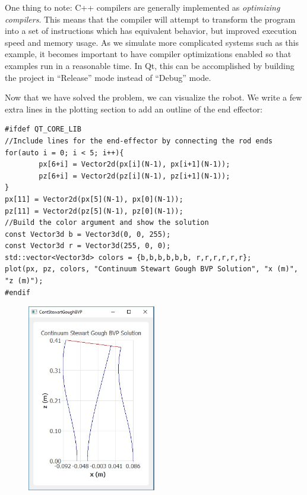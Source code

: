 \documentclass[12pt]{article}
\begin{document}
One thing to note: C++ compilers are generally implemented as \emph{optimizing compilers}. This means that the compiler will attempt to transform the program into a set of instructions which has equivalent behavior, but improved execution speed and memory usage. As we simulate more complicated systems such as this example, it becomes important to have compiler optimizations enabled so that examples run in a reasonable time. In Qt, this can be accomplished by building the project in ``Release'' mode instead of ``Debug'' mode.

Now that we have solved the problem, we can visualize the robot. We write a few extra lines in the plotting section to add an outline of the end effector:
\begin{lstlisting}
#ifdef QT_CORE_LIB
//Include lines for the end-effector by connecting the rod ends
for(auto i = 0; i < 5; i++){
		px[6+i] = Vector2d(px[i](N-1), px[i+1](N-1));
		pz[6+i] = Vector2d(pz[i](N-1), pz[i+1](N-1));
}
px[11] = Vector2d(px[5](N-1), px[0](N-1));
pz[11] = Vector2d(pz[5](N-1), pz[0](N-1));
//Build the color argument and show the solution
const Vector3d b = Vector3d(0, 0, 255);
const Vector3d r = Vector3d(255, 0, 0);
std::vector<Vector3d> colors = {b,b,b,b,b,b, r,r,r,r,r,r};
plot(px, pz, colors, "Continuum Stewart Gough BVP Solution", "x (m)", "z (m)");
#endif
\end{lstlisting}
\begin{figure}[h]
	\centering
		\includegraphics[width=0.50\textwidth]{fig/SolutionPlot.jpg}
	\label{fig:SolutionPlot}
\end{figure}
\end{document}
